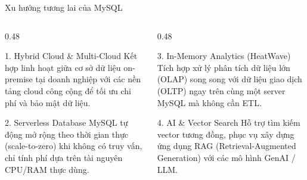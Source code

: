 \documentclass[aspectratio=169,11pt]{beamer}
\begin{document}
\begin{frame}{Xu hướng tương lai của MySQL}
\begin{columns}[t]
  \begin{column}{0.48\textwidth}
    \begin{block}{1. Hybrid Cloud \& Multi-Cloud}
      \small
      Kết hợp linh hoạt giữa cơ sở dữ liệu on-premise tại doanh nghiệp với các nền tảng cloud công cộng để tối ưu chi phí và bảo mật dữ liệu.
    \end{block}
    \begin{block}{2. Serverless Database}
      \small
      MySQL tự động mở rộng theo thời gian thực (scale-to-zero) khi không có truy vấn, chỉ tính phí dựa trên tài nguyên CPU/RAM thực dùng.
    \end{block}
  \end{column}
  \begin{column}{0.48\textwidth}
    \begin{block}{3. In-Memory Analytics (HeatWave)}
      \small
      Tích hợp xử lý phân tích dữ liệu lớn (OLAP) song song với dữ liệu giao dịch (OLTP) ngay trên cùng một server MySQL mà không cần ETL.
    \end{block}
    \begin{block}{4. AI \& Vector Search}
      \small
      Hỗ trợ tìm kiếm vector tương đồng, phục vụ xây dựng ứng dụng RAG (Retrieval-Augmented Generation) với các mô hình GenAI / LLM.
    \end{block}
  \end{column}
\end{columns}
\end{frame}

\end{document}
